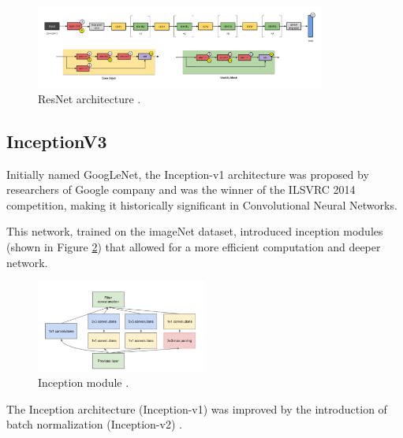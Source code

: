     

    \begin{figure}[H]
        \centering
        \captionsetup{justification=centering}
        \includegraphics[width=0.85\textwidth]{Sections/2StateOfTheArt/2_images/resnet_arch.png}
        \caption[ResNet architecture]{ResNet architecture \cite{cnnarchitectures}.} 
        \label{fig:resnet}
    \end{figure}


    \subsection{InceptionV3}

    \par Initially named GoogLeNet, the Inception-v1 architecture was proposed by researchers of Google company and was the winner of the ILSVRC 2014 competition, making it historically significant in Convolutional Neural Networks. 
    \par This network, trained on the imageNet dataset, introduced inception modules (shown in Figure \ref{fig:inception_module}) that allowed for a more efficient computation and deeper network.

    \begin{figure}[H]
        \centering
        \captionsetup{justification=centering}
        \includegraphics[width=0.5\textwidth]{Sections/2StateOfTheArt/2_images/inceptionArchitecture.png}
        \caption[Inception module]{Inception module \cite{inceptionV3web2}.} 
        \label{fig:inception_module}
    \end{figure}

    \par The Inception architecture (Inception-v1) was improved by the introduction of batch normalization (Inception-v2) \cite{Ribeiro}.



